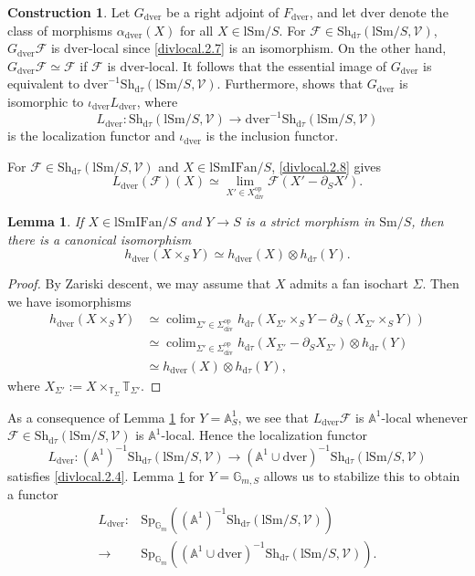 \documentclass[10pt]{amsart}
\newtheorem{lem}[thm]{Lemma}
\theoremstyle{definition}
\newtheorem{const}[thm]{Construction}
\theoremstyle{remark}
\numberwithin{equation}{subsection}
\newcommand{\A}{\mathbb{A}}
\newcommand{\G}{\mathbb{G}}
\newcommand{\T}{\mathbb{T}}
\newcommand{\cF}{\mathcal{F}}
\newcommand{\cV}{\mathcal{V}}
\newcommand{\limit}{\mathop{\mathrm{lim}}}
\newcommand{\Shv}{\mathrm{Sh}}
\newcommand{\Sm}{\mathrm{Sm}}
\newcommand{\colimit}{\mathop{\mathrm{colim}}}
\newcommand{\lSm}{\mathrm{lSm}}
\newcommand{\lSmIFan}{\mathrm{lSmIFan}}
\newcommand{\infShv}{\mathrm{Sh}}
\newcommand{\op}{\mathrm{op}}
\newcommand{\Stab}{\mathrm{Sp}}
\newcommand{\dver}{\mathrm{dver}}
\newcommand{\divi}{\mathrm{div}}
\newcommand{\dtau}{\mathrm{d}\tau}
\begin{document}
\begin{const}
Let $G_{\dver}$ be a right adjoint of $F_{\dver}$, and let $\dver$ denote the class of morphisms $\alpha_{\dver}(X)$ for all $X\in \lSm/S$.
For $\cF\in \Shv_{\dtau}(\lSm/S,\cV)$, $G_{\dver}\cF$ is $\dver$-local since \eqref{divlocal.2.7} is an isomorphism.
On the other hand, $G_{\dver}\cF\simeq \cF$ if $\cF$ is $\dver$-local.
It follows that the essential image of $G_{\dver}$ is equivalent to $\dver^{-1}\infShv_{\dtau}(\lSm/S,\cV)$.
Furthermore, \cite[Proposition 5.2.7.4]{HTT} shows that $G_{\dver}$ is isomorphic to $\iota_{\dver}L_{\dver}$, where
\[
L_{\dver}\colon \infShv_{\dtau}(\lSm/S,\cV) \to \dver^{-1}\infShv_{\dtau}(\lSm/S,\cV)
\]
is the localization functor and $\iota_{\dver}$ is the inclusion functor.

For $\cF\in \infShv_{\dtau}(\lSm/S,\cV)$ and $X\in \lSmIFan/S$, \eqref{divlocal.2.8} gives
\begin{equation}
\label{divlocal.2.4}
L_{\dver}(\cF)(X)
\simeq
\limit_{X'\in X_{\divi}^{\op}}\cF(X'-\partial_S X').
\end{equation}
\end{const}

\begin{lem}
\label{divlocal.5}
If $X\in \lSmIFan/S$ and $Y\to S$ is a strict morphism in $\Sm/S$, then there is a canonical isomorphism
\[
h_{\dver}(X\times_S Y)
\simeq
h_{\dver}(X)\otimes h_{\dtau}(Y).
\]
\end{lem}
\begin{proof}
By Zariski descent, we may assume that $X$ admits a fan isochart $\Sigma$.
Then we have isomorphisms
\begin{align*}
h_{\dver}(X\times_S Y)
&\simeq
\colimit_{\Sigma'\in \Sigma_{\divi}^{\op}}
h_{\dtau}(X_{\Sigma'}\times_S Y-\partial_S (X_{\Sigma'}\times_S Y))
\\
&\simeq
\colimit_{\Sigma'\in \Sigma_{\divi}^{\op}}
h_{\dtau}(X_{\Sigma'}-\partial_S X_{\Sigma'}) \otimes h_{\dtau}(Y)
\\
& \simeq
h_{\dver}(X)\otimes h_{\dtau}(Y),
\end{align*}
where $X_{\Sigma'}:=X\times_{\T_\Sigma}\T_{\Sigma'}$.
\end{proof}

As a consequence of Lemma \ref{divlocal.5} for $Y=\A_S^1$, we see that $L_{\dver}\cF$ is $\A^1$-local whenever $\cF\in \infShv_{\dtau}(\lSm/S,\cV)$ is $\A^1$-local.
Hence the localization functor
\[
L_{\dver}
\colon
(\A^1)^{-1}\infShv_{\dtau}(\lSm/S,\cV)
\to
(\A^1\cup \dver)^{-1}\infShv_{\dtau}(\lSm/S,\cV)
\]
satisfies \eqref{divlocal.2.4}.
Lemma \ref{divlocal.5} for $Y=\G_{m,S}$ allows us to stabilize this to obtain a functor
\begin{align*}
L_{\dver}
\colon
 & \Stab_{\G_m}((\A^1)^{-1}\infShv_{\dtau}(\lSm/S,\cV))
\\
\to &
\Stab_{\G_m}((\A^1\cup \dver)^{-1}\infShv_{\dtau}(\lSm/S,\cV)).
\end{align*}
\end{document}
